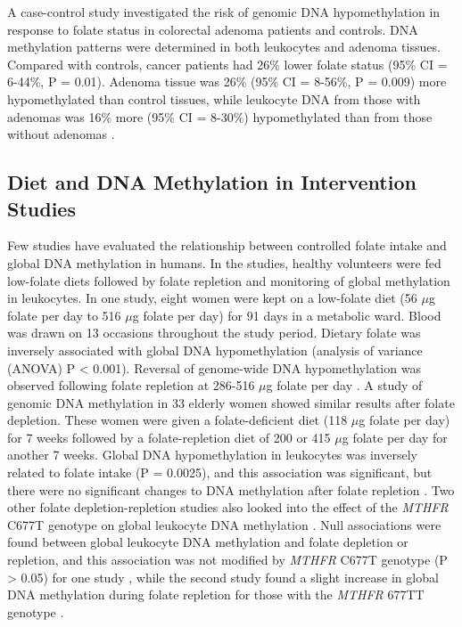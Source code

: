 \noindent A case-control study investigated the risk of genomic DNA hypomethylation in response to folate status in colorectal adenoma patients and controls. DNA methylation patterns were determined in both leukocytes and adenoma tissues. Compared with controls, cancer patients had 26\% lower folate status (95\% CI = 6-44\%, P = 0.01). Adenoma tissue was 26\% (95\% CI = 8-56\%, P = 0.009) more hypomethylated than control tissues, while leukocyte DNA from those with adenomas was 16\% more (95\% CI = 8-30\%) hypomethylated than from those without adenomas \cite{c246}. 
 
\subsection{Diet and DNA Methylation in Intervention Studies} %
\noindent Few studies have evaluated the relationship between controlled folate intake and global DNA methylation in humans. In the studies, healthy volunteers were fed low-folate diets followed by folate repletion and monitoring of global methylation in leukocytes. In one study, eight women were kept on a low-folate diet (56 $\mu$g folate per day to 516 $\mu$g folate per day) for 91 days in a metabolic ward. Blood was drawn on 13 occasions throughout the study period. Dietary folate was inversely associated with global DNA hypomethylation (analysis of variance (ANOVA) P < 0.001). Reversal of genome-wide DNA hypomethylation was observed following folate repletion at 286-516 $\mu$g folate per day \cite{c247}. A study of genomic DNA methylation in 33 elderly women showed similar results after folate depletion. These women were given a folate-deficient diet (118 $\mu$g folate per day) for 7 weeks followed by a folate-repletion diet of 200 or 415 $\mu$g folate per day for another 7 weeks. Global DNA 
hypomethylation in leukocytes was inversely related to folate intake (P = 0.0025), and this association was significant, but there were no significant changes to DNA methylation after folate repletion \cite{c248}. Two other folate depletion-repletion studies also looked into the effect of the \emph{MTHFR} C677T genotype on global leukocyte DNA methylation \cite{c249,c250}. Null associations were found between global leukocyte DNA methylation and folate depletion or repletion, and this association was not modified by \emph{MTHFR} C677T genotype (P > 0.05) for one study \cite{c240}, while the second study found a slight increase in global DNA methylation during folate repletion for those with the \emph{MTHFR} 677TT genotype \cite{c250}. 
 
